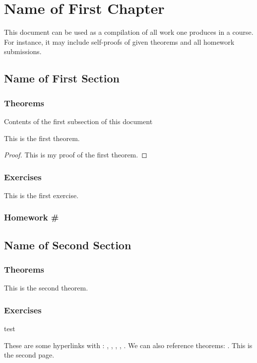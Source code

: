 \documentclass[11pt, a4paper]{book}
\begin{document}
%

%
\tableofcontents
\thispagestyle{empty}
\newpage
\setcounter{page}{1}
%
\chapter{Name of First Chapter}
This document can be used as a compilation of all work one produces in a course. For instance, it may include self-proofs of given theorems and all homework submissions.
%
\section{Name of First Section}
%
\subsection{Theorems}
Contents of the first subsection of this document
\begin{theorem}\label{thm:1.1}
    This is the first theorem.
\end{theorem}
\begin{proof}
    This is my proof of the first theorem.
\end{proof}
%
\subsection{Exercises}
\begin{exercise}\label{ex:1.1}
This is the first exercise.
\end{exercise}
%
\edef\InitialExerciseValue{\arabic{exercise}}
\setcounter{HWNumber}{1}
\subsection{Homework \#}
\setcounter{exercise}{0}
\begingroup
    \renewcommand{\theexercise}{H.\arabic{HWNumber}.\arabic{exercise}}
\endgroup
\setcounter{exercise}{\InitialExerciseValue}
\section{Name of Second Section}
\subsection{Theorems}
\begin{theorem}
    This is the second theorem.
\end{theorem}
\subsection{Exercises}
\begin{exercise}\label{ex:1.2}
    test
\end{exercise}
These are some hyperlinks with : , , , , . We can also reference theorems: . 
\newpage
This is the second page.
\end{document}
